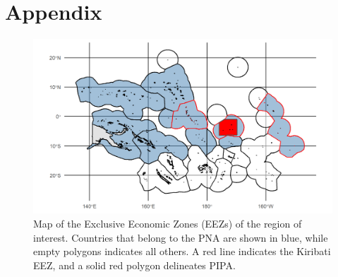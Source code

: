 \documentclass[9p,twocolumn,twoside,lineno]{pnas-new}
\begin{document}

\clearpage

\FloatBarrier

\section{Appendix}\label{appendix}

\newcommand{\beginsupplement}{\setcounter{table}{0}  \renewcommand{\thetable}{S\arabic{table}} \setcounter{figure}{0} \renewcommand{\thefigure}{S\arabic{figure}}}

\setcounter{table}{0}  \renewcommand{\thetable}{S\arabic{table}} \setcounter{figure}{0} \renewcommand{\thefigure}{S\arabic{figure}}

\begin{figure}
\centering
\includegraphics{img/PNA_map.png}
\caption{\label{fig:PNA_map}Map of the Exclusive
Economic Zones (EEZs) of the region of interest. Countries that belong
to the PNA are shown in blue, while empty polygons indicates all others.
A red line indicates the Kiribati EEZ, and a solid red polygon
delineates PIPA.}
\end{figure}
\end{document}
